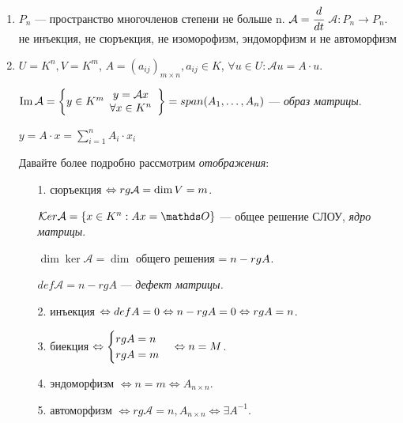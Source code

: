 \begin{enumerate}
    \item $P_n$ --- пространство многочленов степени не больше n. $\mathcal{A}= \cfrac{d}{dt} $ $\mathcal{A}:P_n \rightarrow P_n$. не инъекция, не сюръекция, не изоморофизм, эндоморфизм и не автоморфизм
    \item $U = K^n, V = K^m$, $A = (a_{ij})_{m\times n}, a_{ij} \in K$,  $\forall u \in U   :\mathcal{A}u=A\cdot u$.

    $\operatorname{Im} \mathcal{A} = \left\{y\in K^m \begin{array}{cc}
         y = \mathcal{A}x \\
          \forall x \in K^n
    \end{array}\right\} = span (A_1,\ldots,A_n)$ --- \emph{образ матрицы}.

    $y = A\cdot x = \sum\limits_{i=1}^nA_i\cdot x_i$

    Давайте более подробно рассмотрим \emph{отображения}:

    \begin{itemize}
        \item[1.] сюръекция $\Leftrightarrow rg \mathcal{A} = \dim V  = m$.

        $\ker \mathcal{A} = \{x \in K^n: Ax = \zero\}$ --- общее решение СЛОУ, 
        \emph{ядро матрицы}.

        $\dim \ker \mathcal{A} = \dim $ общего решения $= n - rg A$.

            $def \mathcal{A} = n - rg A$ --- \emph{дефект матрицы.}

        \item[2.] инъекция $\Leftrightarrow def A=0 \Leftrightarrow n-rg A = 0 \Leftrightarrow rg A = n$.

        \item[3.] биекция $\Leftrightarrow \begin{cases}
            rg A = n \\
            rg A = m
        \end{cases} \Leftrightarrow n = M$.

        \item[4.] эндоморфизм $\Leftrightarrow n = m \Leftrightarrow A_{n \times n}$.

        \item[5.] автоморфизм $\Leftrightarrow rg \mathcal{A} = n, A_{n\times n }\Leftrightarrow \exists A^{-1}$.
    \end{itemize}
    
   
\end{enumerate}



